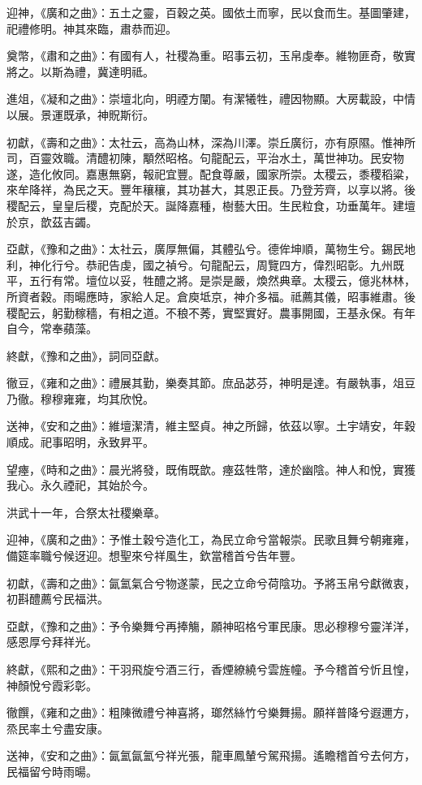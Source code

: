 迎神，《廣和之曲》：五土之靈，百穀之英。國依土而寧，民以食而生。基圖肇建，祀禮修明。神其來臨，肅恭而迎。

奠幣，《肅和之曲》：有國有人，社稷為重。昭事云初，玉帛虔奉。維物匪奇，敬實將之。以斯為禮，冀達明祗。

進俎，《凝和之曲》：崇壇北向，明禋方闡。有潔犧牲，禮因物顯。大房載設，中情以展。景運既承，神貺斯衍。

初獻，《壽和之曲》：太社云，高為山林，深為川澤。崇丘廣衍，亦有原隰。惟神所司，百靈效職。清醴初陳，顒然昭格。句龍配云，平治水土，萬世神功。民安物遂，造化攸同。嘉惠無窮，報祀宜豐。配食尊嚴，國家所崇。太稷云，黍稷稻粱，來牟降祥，為民之天。豐年穰穰，其功甚大，其恩正長。乃登芳齊，以享以將。後稷配云，皇皇后稷，克配於天。誕降嘉種，樹藝大田。生民粒食，功垂萬年。建壇於京，歆茲吉蠲。

亞獻，《豫和之曲》：太社云，廣厚無偏，其體弘兮。德侔坤順，萬物生兮。錫民地利，神化行兮。恭祀告虔，國之禎兮。句龍配云，周覽四方，偉烈昭彰。九州既平，五行有常。壇位以妥，牲醴之將。是崇是嚴，煥然典章。太稷云，億兆林林，所資者穀。雨暘應時，家給人足。倉庾坻京，神介多福。祗薦其儀，昭事維肅。後稷配云，躬勤稼穡，有相之道。不稂不莠，實堅實好。農事開國，王基永保。有年自今，常奉蘋藻。

終獻，《豫和之曲》，詞同亞獻。

徹豆，《雍和之曲》：禮展其勤，樂奏其節。庶品苾芬，神明是達。有嚴執事，俎豆乃徹。穆穆雍雍，均其欣悅。

送神，《安和之曲》：維壇潔清，維主堅貞。神之所歸，依茲以寧。土宇靖安，年穀順成。祀事昭明，永致昇平。

望瘞，《時和之曲》：晨光將發，既侑既歆。瘞茲牲幣，達於幽陰。神人和悅，實獲我心。永久禋祀，其始於今。

洪武十一年，合祭太社稷樂章。

迎神，《廣和之曲》：予惟土穀兮造化工，為民立命兮當報崇。民歌且舞兮朝雍雍，備筵率職兮候迓迎。想聖來兮祥風生，欽當稽首兮告年豐。

初獻，《壽和之曲》：氤氳氣合兮物遂蒙，民之立命兮荷陰功。予將玉帛兮獻微衷，初斟醴薦兮民福洪。

亞獻，《豫和之曲》：予令樂舞兮再捧觴，願神昭格兮軍民康。思必穆穆兮靈洋洋，感恩厚兮拜祥光。

終獻，《熙和之曲》：干羽飛旋兮酒三行，香煙繚繞兮雲旌幢。予今稽首兮忻且惶，神顏悅兮霞彩彰。

徹饌，《雍和之曲》：粗陳微禮兮神喜將，瑯然絲竹兮樂舞揚。願祥普降兮遐邇方，烝民率土兮盡安康。

送神，《安和之曲》：氤氳氤氳兮祥光張，龍車鳳輦兮駕飛揚。遙瞻稽首兮去何方，民福留兮時雨暘。


